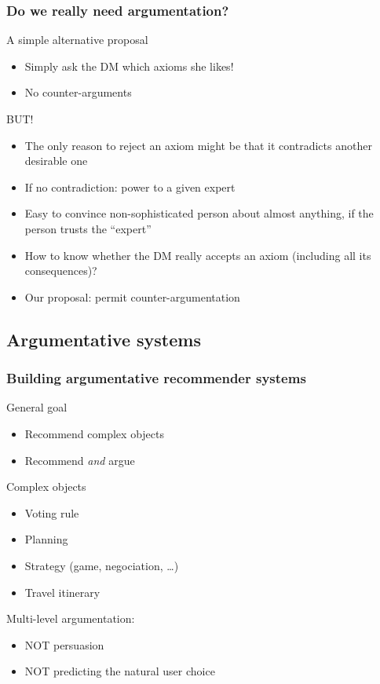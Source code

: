 \documentclass[english]{beamer}
\begin{document}
\begin{frame}
	\frametitle{Do we really need argumentation?}
	\begin{block}{A simple alternative proposal}
		\begin{itemize}
			\item Simply ask the \ac{DM} which axioms she likes!
			\item No counter-arguments
		\end{itemize}
	\end{block}
	BUT!
	\begin{itemize}
		\item The only reason to reject an axiom might be that it contradicts another desirable one
		\item If no contradiction: power to a given expert
		\item Easy to convince non-sophisticated person about almost anything, if the person trusts the “expert”
		\item How to know whether the \ac{DM} really accepts an axiom (including all its consequences)?
		\item Our proposal: permit counter-argumentation
	\end{itemize}
\end{frame}

\subsection{Argumentative systems}
\begin{frame}
	\frametitle{Building argumentative recommender systems}
	
	\begin{block}{General goal}
		\begin{itemize}
			\item Recommend complex objects
			\item Recommend \emph{and} argue
		\end{itemize}
	\end{block}
	\begin{block}{Complex objects}
		\begin{itemize}
			\item Voting rule
			\item Planning
			\item Strategy (game, negociation, …)
			\item Travel itinerary
		\end{itemize}
	\end{block}
	Multi-level argumentation:
	\begin{itemize}
		\item NOT persuasion
		\item NOT predicting the natural user choice
	\end{itemize}
\end{frame}
\end{document}
